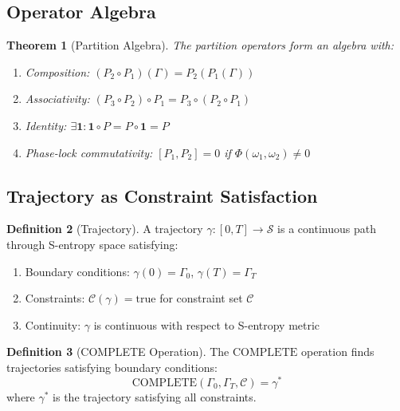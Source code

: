 \documentclass[10pt,twocolumn]{article}
\theoremstyle{plain}
\newtheorem{theorem}{Theorem}[section]
\theoremstyle{definition}
\newtheorem{definition}[theorem]{Definition}
\theoremstyle{remark}
\newcommand{\Sspace}{\mathcal{S}}
\newcommand{\Gstate}{\Gamma}
\newcommand{\Pop}{P}
\begin{document}
\subsection{Operator Algebra}

\begin{theorem}[Partition Algebra]
\label{thm:algebra}
The partition operators form an algebra with:
\begin{enumerate}[label=(\roman*)]
\item \emph{Composition}: $(\Pop_2 \circ \Pop_1)(\Gstate) = \Pop_2(\Pop_1(\Gstate))$
\item \emph{Associativity}: $(\Pop_3 \circ \Pop_2) \circ \Pop_1 = \Pop_3 \circ (\Pop_2 \circ \Pop_1)$
\item \emph{Identity}: $\exists \mathbf{1}: \mathbf{1} \circ \Pop = \Pop \circ \mathbf{1} = \Pop$
\item \emph{Phase-lock commutativity}: $[\Pop_1, \Pop_2] = 0$ if $\Phi(\omega_1, \omega_2) \neq 0$
\end{enumerate}
\end{theorem}

\subsection{Trajectory as Constraint Satisfaction}

\begin{definition}[Trajectory]
\label{def:trajectory}
A trajectory $\gamma: [0,T] \to \Sspace$ is a continuous path through S-entropy space satisfying:
\begin{enumerate}[label=(\roman*)]
\item Boundary conditions: $\gamma(0) = \Gstate_0$, $\gamma(T) = \Gstate_T$
\item Constraints: $\mathcal{C}(\gamma) = \mathrm{true}$ for constraint set $\mathcal{C}$
\item Continuity: $\gamma$ is continuous with respect to S-entropy metric
\end{enumerate}
\end{definition}

\begin{definition}[COMPLETE Operation]
\label{def:complete}
The $\mathrm{COMPLETE}$ operation finds trajectories satisfying boundary conditions:
\begin{equation}
\mathrm{COMPLETE}(\Gstate_0, \Gstate_T, \mathcal{C}) = \gamma^*
\label{eq:complete}
\end{equation}
where $\gamma^*$ is the trajectory satisfying all constraints.
\end{definition}
\end{document}
